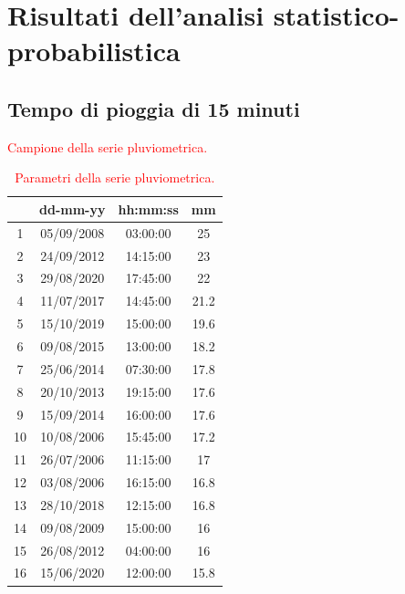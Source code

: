 \section{Risultati dell'analisi statistico-probabilistica}
\subsection{Tempo di pioggia di 15 minuti}

\begin{table}[H]
    \begin{minipage}{.5\linewidth}
      \caption{\textcolor{red}{Campione della serie pluviometrica.}}
      \centering
        \begin{tabular}{cccc}
            \toprule    
            & dd-mm-yy   & hh:mm:ss & mm \\
            \midrule
         1  & 05/09/2008 & 03:00:00 & 25   \\
         2  & 24/09/2012 & 14:15:00 & 23   \\
         3  & 29/08/2020 & 17:45:00 & 22   \\
         4  & 11/07/2017 & 14:45:00 & 21.2 \\
         5  & 15/10/2019 & 15:00:00 & 19.6 \\
         6  & 09/08/2015 & 13:00:00 & 18.2 \\
         7  & 25/06/2014 & 07:30:00 & 17.8 \\
         8  & 20/10/2013 & 19:15:00 & 17.6 \\
         9  & 15/09/2014 & 16:00:00 & 17.6 \\
         10 & 10/08/2006 & 15:45:00 & 17.2 \\
         11 & 26/07/2006 & 11:15:00 & 17   \\
         12 & 03/08/2006 & 16:15:00 & 16.8 \\
         13 & 28/10/2018 & 12:15:00 & 16.8 \\
         14 & 09/08/2009 & 15:00:00 & 16   \\
         15 & 26/08/2012 & 04:00:00 & 16   \\
         16 & 15/06/2020 & 12:00:00 & 15.8 \\
         \bottomrule
        \end{tabular}
    \end{minipage}%
    \begin{minipage}{.5\linewidth}
      \centering
        \caption{\textcolor{red}{Parametri della serie pluviometrica.}}

\end{minipage}
\end{table}
